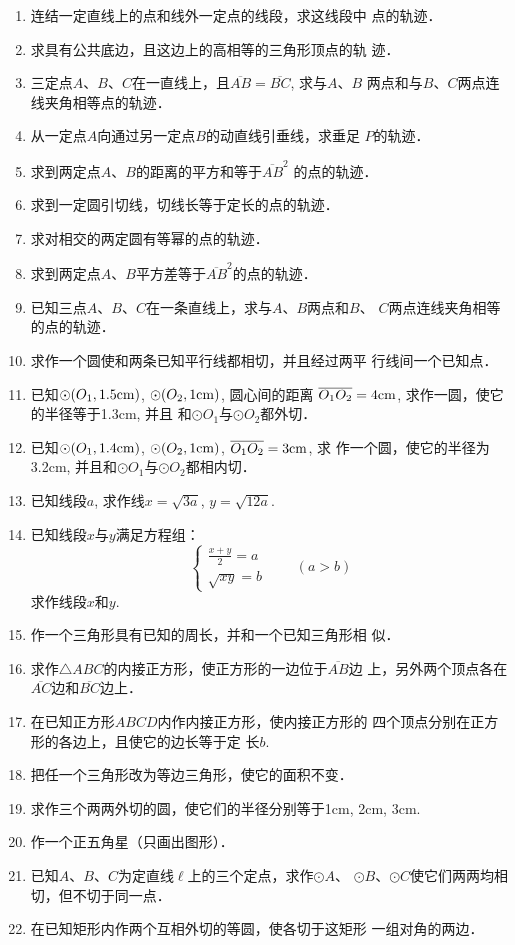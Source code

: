 \begin{enumerate}
    \item 连结一定直线上的点和线外一定点的线段，求这线段中
    点的轨迹．
    \item 求具有公共底边，且这边上的高相等的三角形顶点的轨
    迹．
    \item 三定点$A$、$B$、$C$在一直线上，且$\overline{AB}=\overline{BC}$, 求与$A$、$B$
    两点和与$B$、$C$两点连线夹角相等点的轨迹．
    \item 从一定点$A$向通过另一定点$B$的动直线引垂线，求垂足
    $P$的轨迹．
    \item 求到两定点$A$、$B$的距离的平方和等于$\overline{AB}^2$
    的点的轨迹．
    \item 求到一定圆引切线，切线长等于定长的点的轨迹．
    \item 求对相交的两定圆有等幂的点的轨迹．
    \item 求到两定点$A$、$B$平方差等于$\overline{AB}^2$的点的轨迹．
    \item 已知三点$A$、$B$、$C$在一条直线上，求与$A$、$B$两点和$B$、
   $ C$两点连线夹角相等的点的轨迹．
    \item 求作一个圆使和两条已知平行线都相切，并且经过两平
    行线间一个已知点．
    \item 已知$\odot(O_1,1.5{\rm cm})$, $\odot(O_2,1{\rm cm})$, 圆心间的距离
    $\overline{O_1O_2}=4{\rm cm}$, 求作一圆，使它的半径等于1.3cm, 并且
    和$\odot O_1$与$\odot O_2$都外切．
    \item 已知$\odot(O_1,1.4{\rm cm})$, $\odot(O_2,1{\rm cm})$, $\overline{O_1O_2}=3{\rm cm}$, 求
    作一个圆，使它的半径为3.2cm, 并且和$\odot O_1$与$\odot O_2$都相内切．
    \item 已知线段$a$, 求作线$x=\sqrt{3a}$, $y=\sqrt{12a}$.
    \item 已知线段$x$与$y$满足方程组：
    \[\begin{cases}
        \frac{x+y}{2}=a\\
        \sqrt{xy}=b
    \end{cases}\qquad (a>b)\]
    求作线段$x$和$y$. 
    \item 作一个三角形具有已知的周长，并和一个已知三角形相
似．
\item 求作$\triangle ABC$的内接正方形，使正方形的一边位于$\overline{AB}$边
上，另外两个顶点各在$\overline{AC}$边和$\overline{BC}$边上．
\item 在已知正方形$ABCD$内作内接正方形，使内接正方形的
四个顶点分别在正方形的各边上，且使它的边长等于定
长$b$.
\item 把任一个三角形改为等边三角形，使它的面积不变．
\item 求作三个两两外切的圆，使它们的半径分别等于1cm,
 2cm, 3cm.
\item 作一个正五角星（只画出图形）．
\item 已知$A$、$B$、$C$为定直线$\ell$上的三个定点，求作$\odot A$、
$\odot B$、$\odot C$使它们两两均相切，但不切于同一点．
\item 在已知矩形内作两个互相外切的等圆，使各切于这矩形
一组对角的两边．
\end{enumerate}
